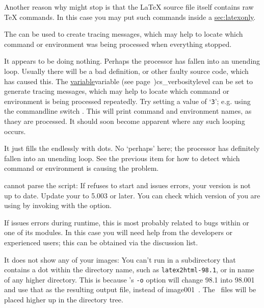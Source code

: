 \begin{htmllist}
Another reason why \latextohtml{} might stop is that the \LaTeX{} source
file itself contains raw \TeX{} commands. In this case you may 
put such commands inside a 
\hyperref{environment}{environment (see Section }{)}{sec:latexonly}.

The   can be used 
to create tracing messages, which may help to locate which command 
or environment was being processed when everything stopped.

\item [It appears to be doing nothing.\label{looping}]
Perhaps the processor has fallen into an unending loop.
Usually there will be a bad definition, or other faulty source code,
which has caused this.
The  \hyperref[page]{variable}{variable (see page~}{)}{cs_verbositylevel}%
can be set to generate tracing messages, which may help to locate which command 
or environment is being processed repeatedly.
Try setting a value of `\texttt{3}'; e.g. using the commandline switch .
This will print command and environment names, as thaey are processed.
It should soon become apparent where any such looping occurs.

\item [It just fills the endlessly with dots.]
No `perhaps' here; the processor has definitely fallen into an unending loop.
See the previous item for how to detect which command or environment
is causing the problem.

\item [\Perl{} cannot parse the \fn{latex2html} script: ]
If \Perl{} refuses to start \latextohtml{} and issues errors, your
\Perl{} version is not up to date.
Update your \Perl{} to 5.003 or later. You can check which version of
\Perl{} you are using by invoking \Perl{} with the  option.

If \Perl{} issues errors during runtime, this is most probably related
to bugs within \latextohtml{} or one of its modules.
In this case you will need help from the developers or experienced users;
this can be obtained via the discussion list.


\item [It does not show any of your images: ]
  You can't run \latextohtml{} in a subdirectory that contains a dot
  within the directory name, such as {\tt latex2html-98.1},
  or in name of any higher directory.
  This is because 's \texttt{-o} option will change 98.1 into 98.001
  and use that as the resulting output file, instead of image001~.
  The \PS\ files will be placed higher up in the directory tree.


\end{htmllist}
